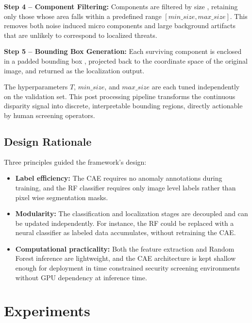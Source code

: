 \documentclass{bmvc2k}
\begin{document}
\textbf{Step 4 -- Component Filtering:}
Components are filtered by size \cite{hassan2021unsupervised}, retaining only those whose area falls within a predefined range $[min\_size, max\_size]$. This removes both noise induced micro components and large background artifacts that are unlikely to correspond to localized threats.

\textbf{Step 5 -- Bounding Box Generation:}
Each surviving component is enclosed in a padded bounding box \cite{defard2020padim}, projected back to the coordinate space of the original image, and returned as the localization output.

The hyperparameters $T$, $min\_size$, and $max\_size$ are each tuned independently on the validation set. This post processing pipeline transforms the continuous disparity signal into discrete, interpretable bounding regions, directly actionable by human screening operators.

\subsection{Design Rationale}

Three principles guided the framework's design:

\begin{itemize}
    \item \textbf{Label efficiency:} The CAE requires no anomaly annotations \cite{akcay2018ganomaly, bergmann2019mvtec} during training, and the RF classifier requires only image level labels rather than pixel wise segmentation masks.
    
    \item \textbf{Modularity:} The classification and localization stages are decoupled \cite{hassan2021unsupervised} and can be updated independently. For instance, the RF could be replaced with a neural classifier as labeled data accumulates, without retraining the CAE.
    
    \item \textbf{Computational practicality:} Both the feature extraction and Random Forest inference are lightweight, and the CAE architecture is kept shallow enough for deployment in time constrained security screening environments without GPU dependency at inference time.
\end{itemize}

\section{Experiments}
\end{document}
